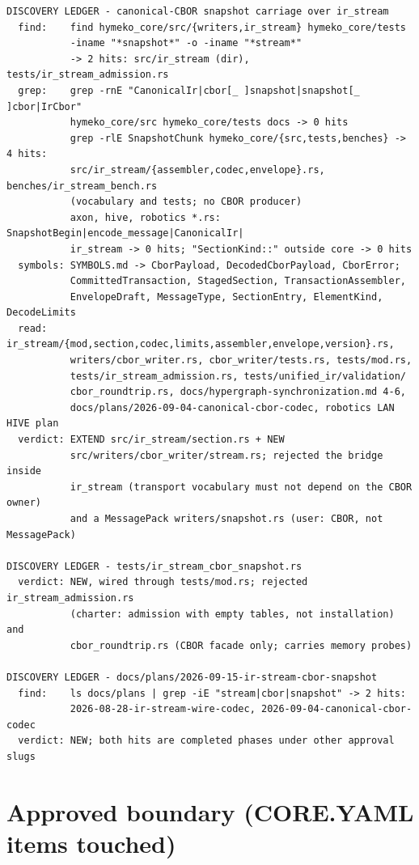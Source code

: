 \documentclass[11pt,a4paper]{article}
\begin{document}
\begin{small}
\begin{verbatim}
DISCOVERY LEDGER - canonical-CBOR snapshot carriage over ir_stream
  find:    find hymeko_core/src/{writers,ir_stream} hymeko_core/tests
           -iname "*snapshot*" -o -iname "*stream*"
           -> 2 hits: src/ir_stream (dir), tests/ir_stream_admission.rs
  grep:    grep -rnE "CanonicalIr|cbor[_ ]snapshot|snapshot[_ ]cbor|IrCbor"
           hymeko_core/src hymeko_core/tests docs -> 0 hits
           grep -rlE SnapshotChunk hymeko_core/{src,tests,benches} -> 4 hits:
           src/ir_stream/{assembler,codec,envelope}.rs, benches/ir_stream_bench.rs
           (vocabulary and tests; no CBOR producer)
           axon, hive, robotics *.rs: SnapshotBegin|encode_message|CanonicalIr|
           ir_stream -> 0 hits; "SectionKind::" outside core -> 0 hits
  symbols: SYMBOLS.md -> CborPayload, DecodedCborPayload, CborError;
           CommittedTransaction, StagedSection, TransactionAssembler,
           EnvelopeDraft, MessageType, SectionEntry, ElementKind, DecodeLimits
  read:    ir_stream/{mod,section,codec,limits,assembler,envelope,version}.rs,
           writers/cbor_writer.rs, cbor_writer/tests.rs, tests/mod.rs,
           tests/ir_stream_admission.rs, tests/unified_ir/validation/
           cbor_roundtrip.rs, docs/hypergraph-synchronization.md 4-6,
           docs/plans/2026-09-04-canonical-cbor-codec, robotics LAN HIVE plan
  verdict: EXTEND src/ir_stream/section.rs + NEW
           src/writers/cbor_writer/stream.rs; rejected the bridge inside
           ir_stream (transport vocabulary must not depend on the CBOR owner)
           and a MessagePack writers/snapshot.rs (user: CBOR, not MessagePack)

DISCOVERY LEDGER - tests/ir_stream_cbor_snapshot.rs
  verdict: NEW, wired through tests/mod.rs; rejected ir_stream_admission.rs
           (charter: admission with empty tables, not installation) and
           cbor_roundtrip.rs (CBOR facade only; carries memory probes)

DISCOVERY LEDGER - docs/plans/2026-09-15-ir-stream-cbor-snapshot
  find:    ls docs/plans | grep -iE "stream|cbor|snapshot" -> 2 hits:
           2026-08-28-ir-stream-wire-codec, 2026-09-04-canonical-cbor-codec
  verdict: NEW; both hits are completed phases under other approval slugs
\end{verbatim}
\end{small}

\section{Approved boundary (CORE.YAML items touched)}
\end{document}
